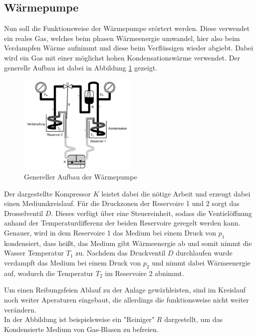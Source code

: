 \subsection*{Wärmepumpe}
Nun soll die Funktionsweise der Wärmepumpe erörtert werden.
Diese verwendet ein reales Gas, welches beim phasen Wärmeenergie umwandel, hier also beim Verdampfen Wärme 
aufnimmt und diese beim Verflüssigen wieder abgiebt.
Dabei wird ein Gas mit einer möglichst hohen Kondensationswärme verwendet.
Der generelle Aufbau ist dabei in Abbildung \ref{fig:aufbau_generell} gezeigt.
\begin{figure}[H]
    \centering
    \includegraphics[width=0.5\textwidth]{bilder/aufbau_generell.jpg}
    \caption{Genereller Aufbau der Wärmepumpe \cite[196]{Anleitung}}
    \label{fig:aufbau_generell}
\end{figure}
Der dargestellte Kompressor $K$ leistet dabei die nötige Arbeit und 
erzeugt dabei einen Mediumkreislauf. Für die Druckzonen
der Reservoire 1 und 2 sorgt das Drosselventil $D$.
Dieses verfügt über eine Steuereinheit, sodass die Ventielöffnung
anhand der Temperaturdifferenz der beiden Reservoire geregelt werden kann.\\

Genauer, wird in dem Reservoire 1 das Medium bei einem Druck von $p_1$ kondensiert, dass heißt, das Medium gibt Wärmeenergie
ab und somit nimmt die Wasser Temperatur $T_1$ zu.
Nachdem das Druckventil $D$ durchlaufen wurde verdampft das Medium bei einem Druck von $p_2$ und nimmt dabei Wärmeenergie auf,
wodurch die Temperatur $T_2$ im Reservoire 2 abnimmt.

Um einen Reibungsfeien Ablauf zu der Anlage gewärhleisten, sind
im Kreislauf noch weiter Aperaturen eingebaut, die allerdings die funktionsweise
nicht weiter verändern.\\
In der Abbildung ist beispielsweise ein "Reiniger" $R$ dargestellt, um 
das Kondensierte Medium von Gas-Blasen zu befreien.  


